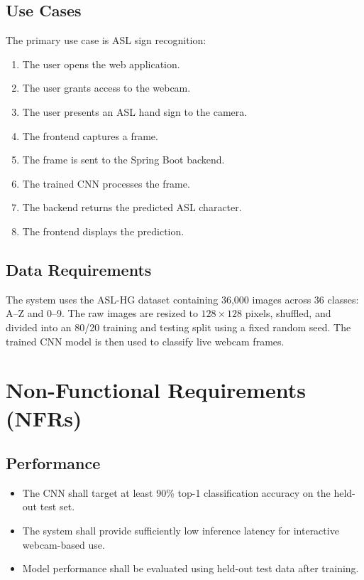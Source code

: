 \documentclass{article}
\begin{document}
\subsection{Use Cases}
The primary use case is ASL sign recognition:
\begin{enumerate}
    \item The user opens the web application.
    \item The user grants access to the webcam.
    \item The user presents an ASL hand sign to the camera.
    \item The frontend captures a frame.
    \item The frame is sent to the Spring Boot backend.
    \item The trained CNN processes the frame.
    \item The backend returns the predicted ASL character.
    \item The frontend displays the prediction.
\end{enumerate}

\subsection{Data Requirements}
The system uses the ASL-HG dataset containing 36,000 images across 36 classes: A--Z and 0--9. The raw images are resized to $128 \times 128$ pixels, shuffled, and divided into an 80/20 training and testing split using a fixed random seed. The trained CNN model is then used to classify live webcam frames.


\section{Non-Functional Requirements (NFRs)}

\subsection{Performance}
\begin{itemize}
    \item The CNN shall target at least 90\% top-1 classification accuracy on the held-out test set.
    \item The system shall provide sufficiently low inference latency for interactive webcam-based use.
    \item Model performance shall be evaluated using held-out test data after training.
\end{itemize}
\end{document}
